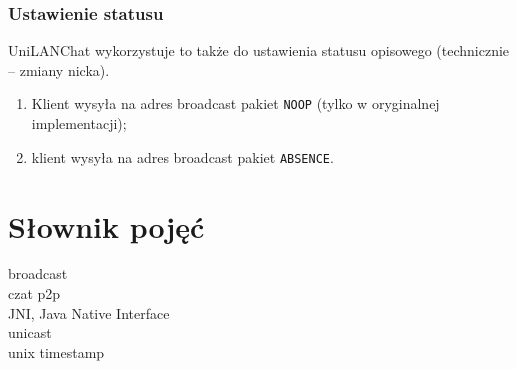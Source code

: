 \documentclass[11pt,leqno]{article}
\begin{document}
\subsubsection{Ustawienie statusu}

UniLANChat wykorzystuje to także do ustawienia statusu opisowego (technicznie -- zmiany nicka).
\begin{enumerate}
	\item Klient wysyła na adres broadcast pakiet \texttt{NOOP} (tylko w oryginalnej
	implementacji);
	\item klient wysyła na adres broadcast pakiet \texttt{ABSENCE}.
\end{enumerate}




\section{Słownik pojęć} \label{sec:dictionary}

\begin{description}
	\item[broadcast]
	\item[czat p2p]
	\item[JNI, Java Native Interface]
	\item[unicast]
	\item[unix timestamp]
\end{description}
\end{document}
